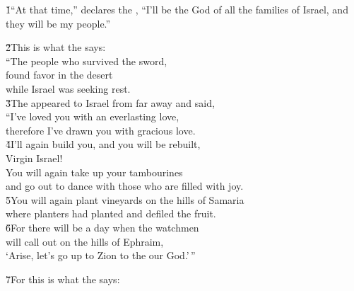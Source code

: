 \v{1}``At that time,'' declares the , ``I'll be the God of all the families of Israel, and they will be my people.''

\begin{poetry}
\poeml \v{2}This is what the  says: \\
\poeml ``The people who survived the sword, \\
\poemll    found favor in the desert \\
\poemlll       while Israel was seeking rest. \\
\poeml \v{3}The  appeared to Israel from far away and said, \\
\poemll    ``I've loved you with an everlasting love, \\
\poemlll       therefore I've drawn you with gracious love. \\
\poeml \v{4}I'll again build you, and you will be rebuilt, \\
\poemll    Virgin Israel! \\
\poeml You will again take up your tambourines \\
\poemll    and go out to dance with those who are filled with joy. \\
\poeml \v{5}You will again plant vineyards on the hills of Samaria \\
\poemll    where planters had planted and defiled the fruit. \\
\poeml \v{6}For there will be a day when the watchmen \\
\poemll    will call out on the hills of Ephraim, \\
\poemll    `Arise, let's go up to Zion to the  our God.'\,''
\end{poetry}

\begin{poetry}
\poeml \v{7}For this is what the  says:
\end{poetry}

